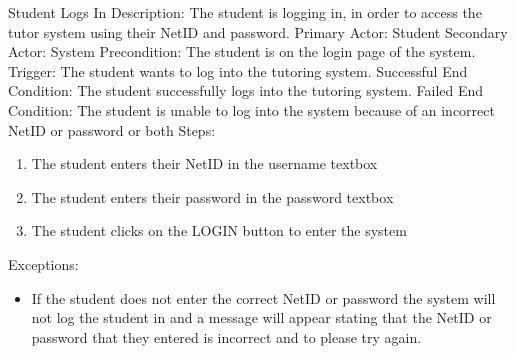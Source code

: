     \begin{section}{Student Logs In}
        Description: The student is logging in, in order to access the tutor system using their NetID and password. \newline
        Primary Actor: Student \newline
        Secondary Actor: System \newline
        Precondition: The student is on the login page of the system. \newline
        Trigger: The student wants to log into the tutoring system. \newline
        Successful End Condition: The student successfully logs into the tutoring system. \newline
        Failed End Condition:  The student is unable to log into the system because of an incorrect NetID or password or both \newline
        \newline
        Steps:
        \begin{enumerate}
            \item{The student enters their NetID in the username textbox}
            \item{The student enters their password in the password textbox}
            \item{The student clicks on the LOGIN button to enter the system}
        \end{enumerate}
        Exceptions:
        \begin{itemize}
            \item{If the student does not enter the correct NetID or password the system will 
            not log the student in and a message will appear stating that the NetID or password 
            that they entered is incorrect and to please try again.}
        \end{itemize}
    \end{section}
        
